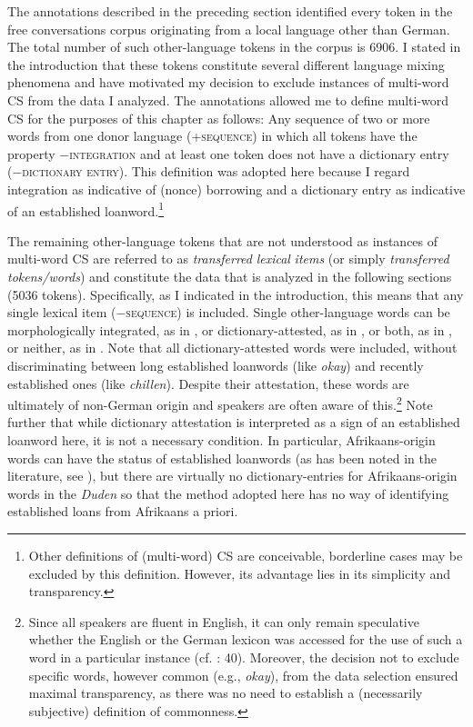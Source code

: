 \documentclass[output=paper]{langsci/langscibook}
\begin{document}
The annotations described in the preceding section identified every token in the free conversations corpus originating from a local language other than German. The total number of such other-language tokens in the corpus is 6906. I stated in the introduction that these tokens constitute several different language mixing phenomena and have motivated my decision to exclude instances of multi-word CS from the data I analyzed. The annotations allowed me to define multi-word CS for the purposes of this chapter as follows: Any sequence of two or more words from one donor language (+\textsc{sequence}) in which all tokens have the property −\textsc{integration} and at least one token does not have a dictionary entry (−⁠\textsc{dictionary} \textsc{entry).} This definition was adopted here because I regard integration as indicative of (nonce) borrowing and a dictionary entry as indicative of an established loanword.\footnote{Other definitions of (multi-word) CS are conceivable, borderline cases may be excluded by this definition. However, its advantage lies in its simplicity and transparency.}

The remaining other-language tokens that are not understood as instances of multi-word CS are referred to as \textit{transferred} \textit{lexical} \textit{items} (or simply \textit{transferred} \textit{tokens/words}) and constitute the data that is analyzed in the following sections (5036 tokens). Specifically, as I indicated in the introduction, this means that any single lexical item (−⁠\textsc{sequence}) is included. Single other-language words can be morphologically integrated, as in , or dictionary-attested, as in , or both, as in , or neither, as in . Note that all dictionary-attested words were included, without discriminating between long established loanwords (like \textit{okay}) and recently established ones (like \textit{chillen}). Despite their attestation, these words are ultimately of non-German origin and speakers are often aware of this.\footnote{Since all speakers are fluent in English, it can only remain speculative whether the English or the German lexicon was accessed for the use of such a word in a particular instance (cf. \citealt{haspelmath_lexical_2009}: 40). Moreover, the decision not to exclude specific words, however common (e.g., \textit{okay}), from the data selection ensured maximal transparency, as there was no need to establish a (necessarily subjective) definition of commonness.} Note further that while dictionary attestation is interpreted as a sign of an established loanword here, it is not a necessary condition. In particular, Afrikaans-origin words can have the status of established loanwords (as has been noted in the literature, see ), but there are virtually no dictionary-entries for Afrikaans-origin words in the \textit{Duden} so that the method adopted here has no way of identifying established loans from Afrikaans a priori.
\end{document}
